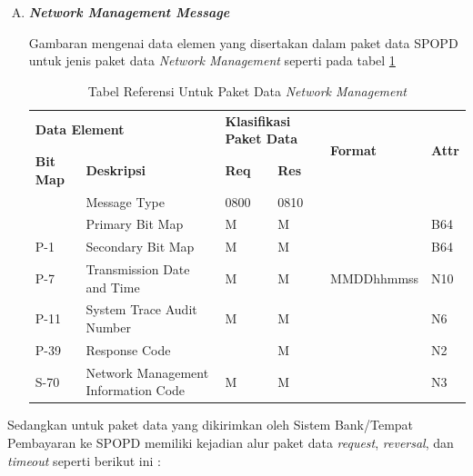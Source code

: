 \begin{enumerate}[A.]
  \item \textbf{\textit{Network Management Message}}
  
  Gambaran mengenai data elemen yang disertakan dalam paket data SPOPD untuk jenis paket data \textit{Network Management} seperti pada tabel \ref{tab:net-manage}
  
  \begin{table}[H]
    \scriptsize
    \centering
    \begin{tabular}{|p{3em}|p{10em}|p{3em}|p{3em}|l|l|}
      \hline
      \multicolumn{2}{|p{13em}|}{\textbf{Data Element}} & \multicolumn{2}{|p{6em}|}{\textbf{Klasifikasi Paket Data}} & \multirow{2}{*}{\textbf{Format}} & \multirow{2}{*}{\textbf{Attr}} \\
      \cline{1-4}
      \textbf{Bit Map} & \textbf{Deskripsi} & \textbf{Req} & \textbf{Res} & & \\
      \hline
      \hline
      & Message Type & 0800 & 0810 & & \\
      \hline
      & Primary Bit Map & M & M & & B64 \\
      \hline
      P-1 & Secondary Bit Map & M & M & & B64 \\
      \hline
      P-7 & Transmission Date and Time & M & M & MMDDhhmmss & N10 \\
      \hline
      P-11 & System Trace Audit Number & M & M & & N6 \\
      \hline
      P-39 & Response Code & & M & & N2 \\
      \hline
      S-70 & Network Management Information Code & M & M & & N3 \\
      \hline
    \end{tabular}
    \caption{Tabel Referensi Untuk Paket Data \textit{Network Management}}
    \label{tab:net-manage}
  \end{table}

\end{enumerate}

Sedangkan untuk paket data yang dikirimkan oleh Sistem Bank/Tempat Pembayaran ke SPOPD memiliki kejadian alur paket data \textit{request}, \textit{reversal}, dan \textit{timeout} seperti berikut ini :

